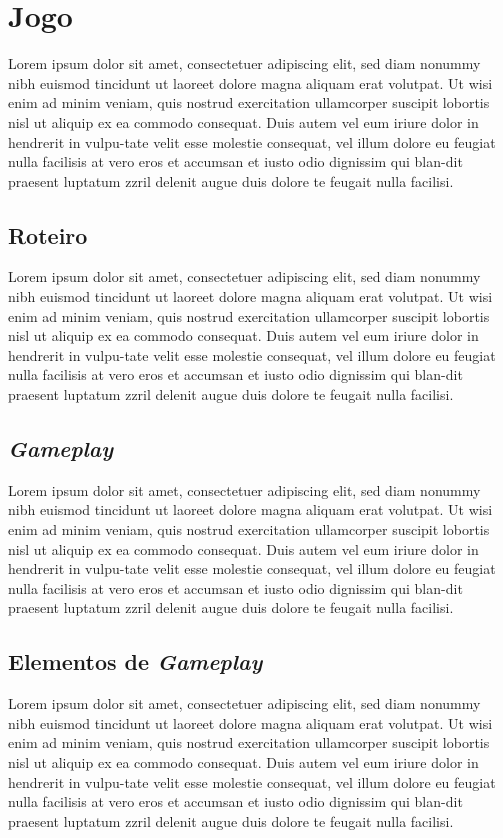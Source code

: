 \section{Jogo}
\label{secao:jogo}
Lorem ipsum dolor sit amet, consectetuer adipiscing elit, sed diam nonummy nibh euismod tincidunt ut laoreet dolore magna aliquam erat volutpat. Ut wisi enim ad minim veniam, quis nostrud exercitation ullamcorper suscipit lobortis nisl ut aliquip ex ea commodo consequat. Duis autem vel eum iriure dolor in hendrerit in vulpu-tate velit esse molestie consequat, vel illum dolore eu feugiat nulla facilisis at vero eros et accumsan et iusto odio dignissim qui blan-dit praesent luptatum zzril delenit augue duis dolore te feugait nulla facilisi.

\subsection{Roteiro}
\label{secao:roteiro}
Lorem ipsum dolor sit amet, consectetuer adipiscing elit, sed diam nonummy nibh euismod tincidunt ut laoreet dolore magna aliquam erat volutpat. Ut wisi enim ad minim veniam, quis nostrud exercitation ullamcorper suscipit lobortis nisl ut aliquip ex ea commodo consequat. Duis autem vel eum iriure dolor in hendrerit in vulpu-tate velit esse molestie consequat, vel illum dolore eu feugiat nulla facilisis at vero eros et accumsan et iusto odio dignissim qui blan-dit praesent luptatum zzril delenit augue duis dolore te feugait nulla facilisi.

\subsection{\textit{Gameplay}}
\label{secao:gameplay}
Lorem ipsum dolor sit amet, consectetuer adipiscing elit, sed diam nonummy nibh euismod tincidunt ut laoreet dolore magna aliquam erat volutpat. Ut wisi enim ad minim veniam, quis nostrud exercitation ullamcorper suscipit lobortis nisl ut aliquip ex ea commodo consequat. Duis autem vel eum iriure dolor in hendrerit in vulpu-tate velit esse molestie consequat, vel illum dolore eu feugiat nulla facilisis at vero eros et accumsan et iusto odio dignissim qui blan-dit praesent luptatum zzril delenit augue duis dolore te feugait nulla facilisi.

\subsection{Elementos de \textit{Gameplay}}
\label{secao:elementos_de_gameplay}
Lorem ipsum dolor sit amet, consectetuer adipiscing elit, sed diam nonummy nibh euismod tincidunt ut laoreet dolore magna aliquam erat volutpat. Ut wisi enim ad minim veniam, quis nostrud exercitation ullamcorper suscipit lobortis nisl ut aliquip ex ea commodo consequat. Duis autem vel eum iriure dolor in hendrerit in vulpu-tate velit esse molestie consequat, vel illum dolore eu feugiat nulla facilisis at vero eros et accumsan et iusto odio dignissim qui blan-dit praesent luptatum zzril delenit augue duis dolore te feugait nulla facilisi.

